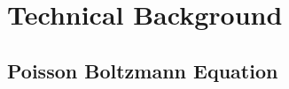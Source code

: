 \chapter{Technical Background}
\label{sec:technical-background}

\section{Poisson Boltzmann Equation}
\label{sec:technical-background-poisson-boltzmann-equation}